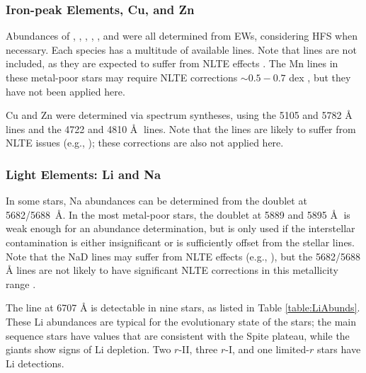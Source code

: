 \documentclass[preprint]{aastex61}
\begin{document}
\subsubsection{Iron-peak Elements, Cu, and Zn}\label{subsec:FePeak}
Abundances of , , , ,
, and  were all determined from EWs,
considering HFS when necessary.  Each species has a multitude of
available lines.  Note that  lines are not included, as
they are expected to suffer from NLTE effects
\citep{BergemannCescutti2010}.   The Mn lines in these metal-poor
stars may require NLTE corrections $\sim0.5-0.7$ dex
\citep{BergemannGehren2008}, but they have not been applied here.

Cu and Zn were determined via spectrum syntheses, using the 5105 and
5782 \AA $\;$  lines and the 4722 and 4810 \AA $\;$
 lines.  Note that the  lines are likely to
suffer from NLTE issues (e.g., \citealt{Shi2018}); these corrections
are also not applied here.


\subsubsection{Light Elements: Li and Na}\label{subsec:Light}
In some stars, Na abundances can be determined from the 
doublet at 5682/5688~\AA.  In the most metal-poor stars, the
 doublet at 5889 and 5895 \AA $\;$ is weak enough for an
abundance determination, but is only used if the interstellar
contamination is either insignificant or is sufficiently offset from
the stellar lines.  Note that the NaD lines may suffer from NLTE
effects (e.g., \citealt{Andrievsky2007}), but the 5682/5688
\AA \hspace{0.025in} lines are not likely to have significant NLTE
corrections in this metallicity range \citep{Lind2011}.

The  line at 6707 \AA \hspace{0.025in} is detectable in
nine stars, as listed in Table \ref{table:LiAbunds}.  These Li 
abundances are typical for the evolutionary state of the stars; the
main sequence stars have values that are consistent with the Spite
plateau, while the giants show signs of Li depletion.  Two $r$-II,
three $r$-I, and one limited-$r$ stars have Li detections.
\end{document}
